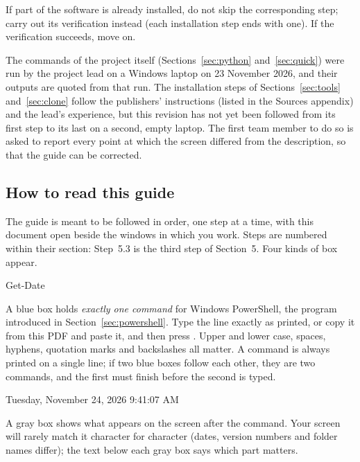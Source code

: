 If part of the software is already installed, do not skip the corresponding step; carry out its
verification instead (each installation step ends with one). If the verification succeeds, move
on.

\begin{note}
The commands of the project itself (Sections~\ref{sec:python} and~\ref{sec:quick}) were run by
the project lead on a Windows laptop on 23 November 2026, and their outputs are quoted from that
run. The installation steps of Sections~\ref{sec:tools} and~\ref{sec:clone} follow the
publishers' instructions (listed in the Sources appendix) and the lead's experience, but this
revision has not yet been followed from its first step to its last on a second, empty laptop.
The first team member to do so is asked to report every point at which the screen differed from
the description, so that the guide can be corrected.
\end{note}

\subsection{How to read this guide}
\label{sec:conventions}

The guide is meant to be followed in order, one step at a time, with this document open beside
the windows in which you work. Steps are numbered within their section: Step~5.3 is the third
step of Section~5. Four kinds of box appear.

\begin{ps}
Get-Date
\end{ps}

A blue box holds \emph{exactly one command} for Windows PowerShell, the program introduced in
Section~\ref{sec:powershell}. Type the line exactly as printed, or copy it from this PDF and
paste it, and then press . Upper and lower case, spaces, hyphens, quotation marks and
backslashes all matter. A command is always printed on a single line; if two blue boxes follow
each other, they are two commands, and the first must finish before the second is typed.

\begin{out}
Tuesday, November 24, 2026 9:41:07 AM
\end{out}

A gray box shows what appears on the screen after the command. Your screen will rarely match it
character for character (dates, version numbers and folder names differ); the text below each
gray box says which part matters.

